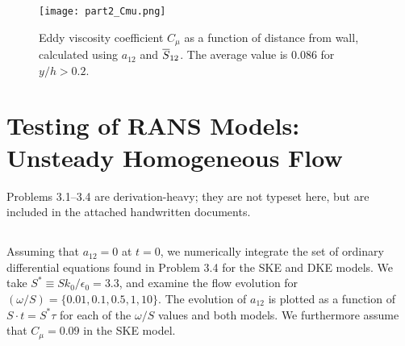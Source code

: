 \documentclass[11pt]{article}
\begin{document}
\begin{figure}[p]
\centering
\texttt{[image: part2\_Cmu.png]}
\vspace{6pt}
\caption{Eddy viscosity coefficient $C_\mu$ as a function of distance from wall, calculated using $a_{12}$ and $\overline{S}_{12}$. The average value is 0.086 for $y/h > 0.2$.}
\label{fig:part2_Cmu}
\end{figure}

\subsection{}



\subsection{}

\subsection{}

\subsection{}

\subsection{}

\section{Testing of RANS Models: Unsteady Homogeneous Flow}

Problems 3.1--3.4 are derivation-heavy; they are not typeset here, but are included in the attached handwritten documents.
\setcounter{subsection}{4}

\subsection{}

Assuming that $a_{12}=0$ at $t=0$, we numerically integrate the set of ordinary differential equations found in Problem 3.4 for the SKE and DKE models. We take $S^* \equiv S k_0 / \epsilon_0 = 3.3$, and examine the flow evolution for $(\omega/S) = \{0.01,0.1,0.5,1,10\}$. The evolution of $a_{12}$ is plotted as a function of $S \cdot t = S^* \tau$ for each of the $\omega/S$ values and both models. We furthermore assume that $C_\mu = 0.09$ in the SKE model.
\end{document}
